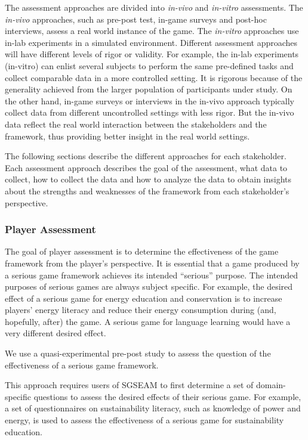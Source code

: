 The assessment approaches are divided into {\em in-vivo} and {\em in-vitro} assessments. The {\em in-vivo} approaches, 
such as pre-post test, in-game surveys and post-hoc interviews, assess a real world instance of the game. 
The {\em in-vitro} approaches use in-lab experiments in a simulated environment. Different assessment
approaches will have different levels of rigor or validity. For example, the in-lab experiments (in-vitro) can 
enlist several subjects to perform the same pre-defined tasks and collect comparable data in a more 
controlled setting. It is rigorous because of the generality achieved from the larger population of
participants under study. On the other hand, in-game surveys or interviews in the in-vivo approach typically 
collect data from different uncontrolled settings with less rigor. But the in-vivo data reflect the real world 
interaction between the stakeholders and the framework, thus providing better insight in the real world settings.

The following sections describe the different approaches for each stakeholder.  Each assessment 
approach describes the goal of the assessment, what data to collect, how to collect the data and how to 
analyze the data to obtain insights about the strengths and weaknesses of the framework from each 
stakeholder's perspective.

\subsubsection{Player Assessment}

The goal of player assessment is to determine the effectiveness of the game
framework from the player's perspective. It is essential that a game produced by a serious game
framework achieves its intended ``serious'' purpose. The intended purposes of serious games are
always subject specific. For example, the desired effect of a serious game for
energy education and conservation is to increase players' energy literacy and
reduce their energy consumption during (and, hopefully, after) the game. A serious game for
language learning would have a very different desired effect.

\label{Pre-Post effectiveness study}

We use a quasi-experimental pre-post study to assess the question of the effectiveness of a serious game framework. 

This approach requires users of SGSEAM to first determine a set of domain-specific questions to assess the 
desired effects of their serious game. For example, a set of questionnaires on sustainability literacy, such as 
knowledge of power and energy, is used to assess the effectiveness of a serious game for sustainability education.

